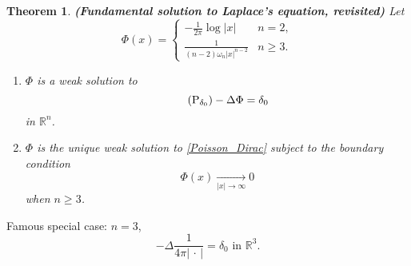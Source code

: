 \documentclass[12pt]{article}
\newtheorem{theorem}{Theorem}[section]
\theoremstyle{definition}
\begin{document}
\begin{theorem}\label{Laplace_sol_review}
\emph{\textbf{(Fundamental solution to Laplace's equation, revisited)}} Let
\[\Phi(x)=\left\{\begin{array}{ll}\displaystyle{-\frac1{2\pi}\log|x|}&n=2,\\\displaystyle{\frac1{(n-2)\omega_n|x|^{n-2}}}&n\geq3.\end{array}\right.\]

\begin{enumerate}[label=\alph*)]
\item $\Phi$ is a weak solution to
\begin{equation}\tag{P$_{\delta_0}$}\label{Poisson_Dirac}
-\Delta\Phi=\delta_0
\end{equation}
in $\mathbb R^n$.

\item $\Phi$ is the unique weak solution to \eqref{Poisson_Dirac} subject to the boundary condition
\[\Phi(x)\xrightarrow[|x|\to\infty]{}0\]
when $n\geq3$.
\end{enumerate}
\end{theorem}

Famous special case: $n=3$,
\[-\Delta\frac1{4\pi|\,\cdot\,|}=\delta_0\text{ in }\mathbb R^3.\]
\end{document}
